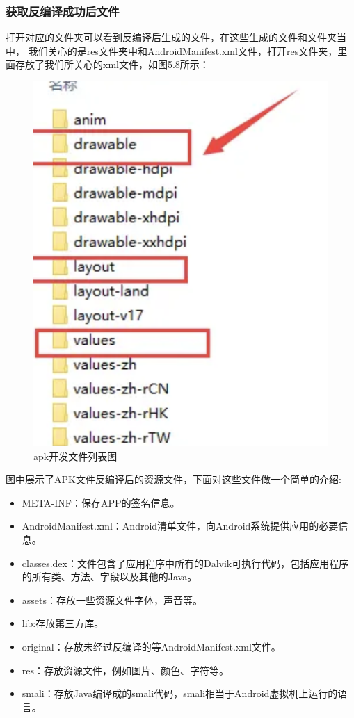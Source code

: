   \subsubsection{获取反编译成功后文件}
  打开对应的文件夹可以看到反编译后生成的文件，在这些生成的文件和文件夹当中，
  我们关心的是res文件夹中和AndroidManifest.xml文件，打开res文件夹，里面存放了我们所关心的xml文件，如图5.8所示：
  \begin{figure}
    \centering
    \includegraphics[scale=0.5]{resources/img/i20.png}
    \caption{apk开发文件列表图}
  \end{figure}
  图中展示了APK文件反编译后的资源文件，下面对这些文件做一个简单的介绍:
  \begin{itemize}
    \item META-INF：保存APP的签名信息。
    \item AndroidManifest.xml：Android清单文件，向Android系统提供应用的必要信息。
    \item classes.dex：文件包含了应用程序中所有的Dalvik可执行代码，包括应用程序的所有类、方法、字段以及其他的Java。
    \item assets：存放一些资源文件字体，声音等。
    \item lib:存放第三方库。
    \item original：存放未经过反编译的等AndroidManifest.xml文件。
    \item res：存放资源文件，例如图片、颜色、字符等。
    \item smali：存放Java编译成的smali代码，smali相当于Android虚拟机上运行的语言。
\end{itemize}
